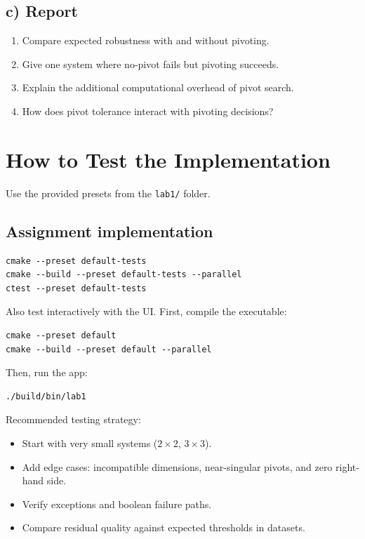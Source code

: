 \documentclass[11pt,a4paper]{article}
\begin{document}
\subsection*{c) Report}
\begin{enumerate}[leftmargin=*]
    \item Compare expected robustness with and without pivoting.
    \item Give one system where no-pivot fails but pivoting succeeds.
    \item Explain the additional computational overhead of pivot search.
    \item How does pivot tolerance interact with pivoting decisions?
\end{enumerate}
\par

\section*{How to Test the Implementation}

Use the provided presets from the \texttt{lab1/} folder.

\subsection*{Assignment implementation}
\begin{verbatim}
cmake --preset default-tests
cmake --build --preset default-tests --parallel
ctest --preset default-tests
\end{verbatim}

Also test interactively with the UI. First, compile the executable:
\begin{verbatim}
cmake --preset default
cmake --build --preset default --parallel
\end{verbatim}

Then, run the app:
\begin{verbatim}
./build/bin/lab1
\end{verbatim}

Recommended testing strategy:
\begin{itemize}[leftmargin=*]
    \item Start with very small systems ($2\times2$, $3\times3$).
    \item Add edge cases: incompatible dimensions, near-singular pivots, and zero right-hand side.
    \item Verify exceptions and boolean failure paths.
    \item Compare residual quality against expected thresholds in datasets.
\end{itemize}
\end{document}
